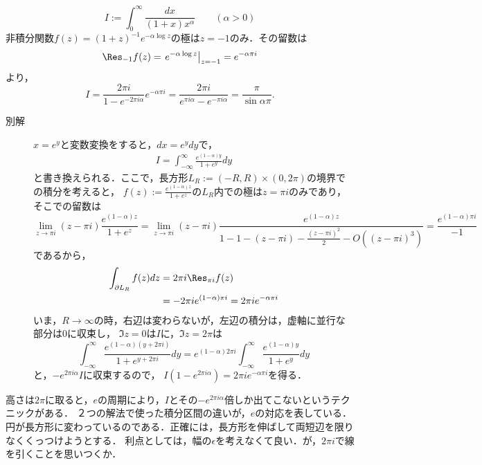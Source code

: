\documentclass[uplatex, dvipdfmx]{jsreport}
\begin{document}
\begin{example}
    \[I:=\int^\infty_0\frac{dx}{(1+x)x^\alpha}\qquad(\alpha>0)\]
    非積分関数$f(z)=(1+z)^{-1}e^{-\alpha\log z}$の極は$z=-1$のみ．その留数は
    \[\Res_{-1}f(z)=\left.e^{-\alpha\log z}\right|_{z=-1}=e^{-\alpha\pi i}\]
    より，
    \[I=\frac{2\pi i}{1-e^{-2\pi i\alpha}}e^{-\alpha\pi i}=\frac{2\pi i}{e^{\pi i\alpha}-e^{-\pi i\alpha}}=\frac{\pi}{\sin\alpha\pi}.\]
    \begin{description}
        \item[別解] 
        $x=e^y$と変数変換をすると，$dx=e^ydy$で，
        \begin{align*}
            I=\int^\infty_{-\infty}\frac{e^{(1-\alpha)y}}{1+e^y}dy
        \end{align*}
        と書き換えられる．ここで，長方形$L_R:=(-R,R)\times(0,2\pi)$の境界での積分を考えると，
        $f(z):=\frac{e^{(1-\alpha)z}}{1+e^z}$の$L_R$内での極は$z=\pi i$のみであり，そこでの留数は
        \[\lim_{z\to\pi i}(z-\pi i)\frac{e^{(1-\alpha)z}}{1+e^z}=\lim_{z\to\pi i}(z-\pi i)\frac{e^{(1-\alpha)z}}{1-1-(z-\pi i)-\frac{(z-\pi i)^2}{2}-O((z-\pi i)^3)}=\frac{e^{(1-\alpha)\pi i}}{-1}\]
        であるから，
        \begin{align*}
            \int_{\partial L_R}f(z)dz&=2\pi i\Res_{\pi i}f(z)\\
            &=-2\pi ie^{(1-\alpha)\pi i}=2\pi ie^{-\alpha\pi i}
        \end{align*}
        いま，$R\to\infty$の時，右辺は変わらないが，左辺の積分は，虚軸に並行な部分は$0$に収束し，
        $\Im z=0$は$I$に，$\Im z=2\pi$は
        \[\int^\infty_{-\infty}\frac{e^{(1-\alpha)(y+2\pi i)}}{1+e^{y+2\pi i}}dy=e^{(1-\alpha)2\pi i}\int^\infty_{-\infty}\frac{e^{(1-\alpha)y}}{1+e^y}dy\]
        と，$-e^{2\pi i\alpha}I$に収束するので，
        $I(1-e^{2\pi i\alpha})=2\pi ie^{-\alpha\pi i}$を得る．
    \end{description}
\end{example}
\begin{remarks}[$e$と言う写像]
    高さは$2\pi$に取ると，$e$の周期により，$I$とその$-e^{2\pi i\alpha}$倍しか出てこないというテクニックがある．
    ２つの解法で使った積分区間の違いが，$e$の対応を表している．
    円が長方形に変わっているのである．正確には，長方形を伸ばして両短辺を限りなくくっつけようとする．
    利点としては，幅の$\epsilon$を考えなくて良い．が，$2\pi i$で線を引くことを思いつくか．
\end{remarks}
\end{document}
